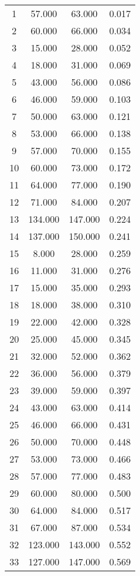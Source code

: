 % 
\begin{tabular}{cccc}
  \hline
  \hline
1 & 57.000 & 63.000 & 0.017 \\ 
  2 & 60.000 & 66.000 & 0.034 \\ 
  3 & 15.000 & 28.000 & 0.052 \\ 
  4 & 18.000 & 31.000 & 0.069 \\ 
  5 & 43.000 & 56.000 & 0.086 \\ 
  6 & 46.000 & 59.000 & 0.103 \\ 
  7 & 50.000 & 63.000 & 0.121 \\ 
  8 & 53.000 & 66.000 & 0.138 \\ 
  9 & 57.000 & 70.000 & 0.155 \\ 
  10 & 60.000 & 73.000 & 0.172 \\ 
  11 & 64.000 & 77.000 & 0.190 \\ 
  12 & 71.000 & 84.000 & 0.207 \\ 
  13 & 134.000 & 147.000 & 0.224 \\ 
  14 & 137.000 & 150.000 & 0.241 \\ 
  15 & 8.000 & 28.000 & 0.259 \\ 
  16 & 11.000 & 31.000 & 0.276 \\ 
  17 & 15.000 & 35.000 & 0.293 \\ 
  18 & 18.000 & 38.000 & 0.310 \\ 
  19 & 22.000 & 42.000 & 0.328 \\ 
  20 & 25.000 & 45.000 & 0.345 \\ 
  21 & 32.000 & 52.000 & 0.362 \\ 
  22 & 36.000 & 56.000 & 0.379 \\ 
  23 & 39.000 & 59.000 & 0.397 \\ 
  24 & 43.000 & 63.000 & 0.414 \\ 
  25 & 46.000 & 66.000 & 0.431 \\ 
  26 & 50.000 & 70.000 & 0.448 \\ 
  27 & 53.000 & 73.000 & 0.466 \\ 
  28 & 57.000 & 77.000 & 0.483 \\ 
  29 & 60.000 & 80.000 & 0.500 \\ 
  30 & 64.000 & 84.000 & 0.517 \\ 
  31 & 67.000 & 87.000 & 0.534 \\ 
  32 & 123.000 & 143.000 & 0.552 \\ 
  33 & 127.000 & 147.000 & 0.569 \\ 

\end{tabular}
